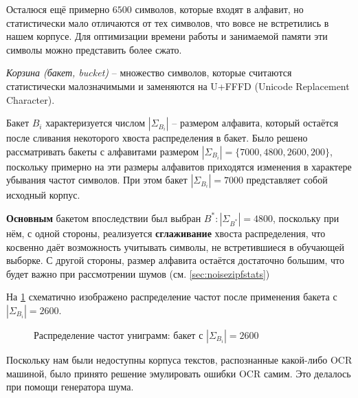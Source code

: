 Осталюся ещё примерно $6500$ символов, которые входят в алфавит, но статистически мало отличаются от тех символов, что вовсе не встретились в нашем корпусе. Для оптимизации времени работы и занимаемой памяти эти символы можно представить более сжато.

\begin{definition}
	{\textit{Корзина (бакет, bucket)}} -- множество символов, которые считаются статистически малозначимыми и заменяются на U+FFFD (Unicode Replacement Character).
\end{definition}

Бакет $B_i$ характеризуется числом $|\Sigma_{B_i}|$ -- размером алфавита, который остаётся после сливания некоторого хвоста распределения в бакет. Было решено рассматривать бакеты с алфавитами размером $|\Sigma_{B_i}| = \{ 7000, 4800, 2600, 200 \}$, поскольку примерно на эти размеры алфавитов приходятся изменения в характере убывания частот символов. При этом бакет $|\Sigma_{B_i}| = 7000$ представляет собой исходный корпус. 

\textbf{Основным} бакетом впоследствии был выбран $B^* : |\Sigma_{B^*}| = 4800$, поскольку при нём, с одной стороны, реализуется \textbf{сглаживание} хвоста распределения, что косвенно даёт возможность учитывать символы, не встретившиеся в обучающей выборке. С другой стороны, размер алфавита остаётся достаточно большим, что будет важно при рассмотрении шумов (см. \cref{sec:noisezipfstats})

На \cref{fig:bucket_pic} схематично изображено распределение частот после применения бакета с $|\Sigma_{B_i}| = 2600$.

\begin{center}

\begin{figure}[H]
	\caption{Распределение частот униграмм: бакет с $|\Sigma_{B_i}| = 2600$}
	\label{fig:bucket_pic}
\end{figure}

\end{center}
Поскольку нам были недоступны корпуса текстов, распознанные какой-либо OCR машиной, было принято решение эмулировать ошибки OCR самим. Это делалось при помощи генератора шума.

